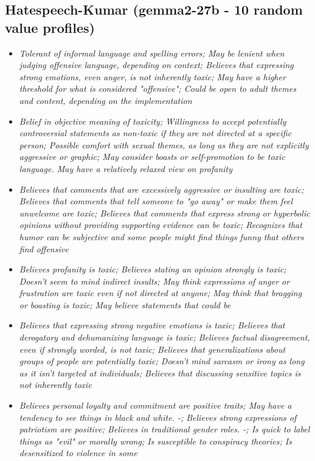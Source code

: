\documentclass[11pt]{article}
\newcommand{\profiletext}[1]{\textit{#1}}
\begin{document}
\subsection{Hatespeech-Kumar (gemma2-27b - 10 random value profiles)}
\begin{itemize}
\item \profiletext{Tolerant of informal language and spelling errors; May be lenient when judging offensive language, depending on context; Believes that expressing strong emotions, even anger, is not inherently toxic; May have a higher threshold for what is considered "offensive"; Could be open to adult themes and content, depending on the implementation}
\item \profiletext{Belief in objective meaning of toxicity; Willingness to accept potentially controversial statements as non-toxic if they are not directed at a specific person; Possible comfort with sexual themes, as long as they are not explicitly aggressive or graphic; May consider boasts or self-promotion to be toxic language. May have a relatively relaxed view on profanity}
\item \profiletext{Believes that comments that are excessively aggressive or insulting are toxic; Believes that comments that tell someone to "go away" or make them feel unwelcome are toxic; Believes that comments that express strong or hyperbolic opinions without providing supporting evidence can be toxic; Recognizes that humor can be subjective and some people might find things funny that others find offensive}
\item \profiletext{Believes profanity is toxic; Believes stating an opinion strongly is toxic; Doesn't seem to mind indirect insults; May think expressions of anger or frustration are toxic even if not directed at anyone; May think that bragging or boasting is toxic; May believe statements that could be}
\item \profiletext{Believes that expressing strong negative emotions is toxic; Believes that derogatory and dehumanizing language is toxic; Believes factual disagreement, even if strongly worded, is not toxic; Believes that generalizations about groups of people are potentially toxic; Doesn't mind sarcasm or irony as long as it isn’t targeted at individuals; Believes that discussing sensitive topics is not inherently toxic}
\item \profiletext{Believes personal loyalty and commitment are positive traits; May have a tendency to see things in black and white. -; Believes strong expressions of patriotism are positive; Believes in traditional gender roles. -; Is quick to label things as "evil" or morally wrong; Is susceptible to conspiracy theories; Is desensitized to violence in some}

\end{itemize}
\end{document}
